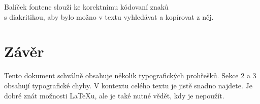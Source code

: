 \documentclass[10pt, twocolumn]{article}
\begin{document}
Balíček {\selectfont fontenc} slouží ke korektnímu kódovaní znaků\\
s diakritikou, aby bylo možno v textu vyhledávat a kopírovat z něj.
\section{Závěr}
Tento dokument schválně obsahuje několik typografických
prohřešků. Sekce 2 a 3 obsahují typografické chyby. V kontextu celého textu je jistě snadno najdete. Je dobré znát
možnosti \LaTeX u, ale je také nutné vědět, kdy je nepoužít.
\end{document}
